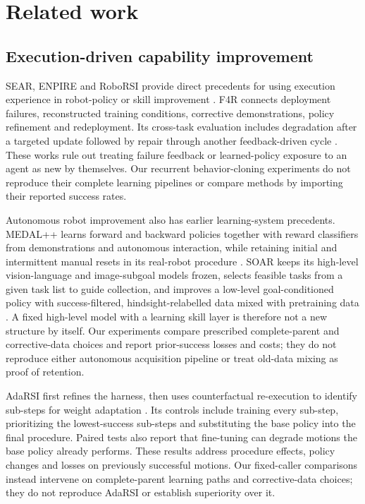 \documentclass[10pt,letterpaper]{article}
\begin{document}
\section{Related work}\label{related-work}

\subsection{Execution-driven capability
improvement}\label{execution-driven-capability-improvement}

SEAR, ENPIRE and RoboRSI provide direct precedents for using execution
experience in robot-policy or skill improvement
\cite{wang2026searselfevolvingagenticrobotics, xiao2026enpireagenticrobotpolicy, wen2026roborsistableefficientreusable}.
F4R connects deployment failures, reconstructed training conditions,
corrective demonstrations, policy refinement and redeployment. Its
cross-task evaluation includes degradation after a targeted update
followed by repair through another feedback-driven cycle
\cite{yu2026f4r}. These works rule out treating failure feedback or
learned-policy exposure to an agent as new by themselves. Our recurrent
behavior-cloning experiments do not reproduce their complete learning
pipelines or compare methods by importing their reported success rates.

Autonomous robot improvement also has earlier learning-system
precedents. MEDAL++ learns forward and backward policies together with
reward classifiers from demonstrations and autonomous interaction, while
retaining initial and intermittent manual resets in its real-robot
procedure \cite{pmlr-v229-sharma23b}. SOAR keeps its high-level
vision-language and image-subgoal models frozen, selects feasible tasks
from a given task list to guide collection, and improves a low-level
goal-conditioned policy with success-filtered, hindsight-relabelled data
mixed with pretraining data \cite{pmlr-v270-zhou25b}. A fixed
high-level model with a learning skill layer is therefore not a new
structure by itself. Our experiments compare prescribed complete-parent
and corrective-data choices and report prior-success losses and costs;
they do not reproduce either autonomous acquisition pipeline or treat
old-data mixing as proof of retention.

AdaRSI first refines the harness, then uses counterfactual re-execution
to identify sub-steps for weight adaptation \cite{wang2026adarsi}. Its
controls include training every sub-step, prioritizing the
lowest-success sub-steps and substituting the base policy into the final
procedure. Paired tests also report that fine-tuning can degrade motions
the base policy already performs. These results address procedure
effects, policy changes and losses on previously successful motions. Our
fixed-caller comparisons instead intervene on complete-parent learning
paths and corrective-data choices; they do not reproduce AdaRSI or
establish superiority over it.
\end{document}
